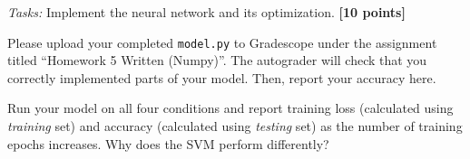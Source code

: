 \begin{tcolorbox}[colback=orange!5!white,colframe=orange!75!black]
\emph{Tasks:} Implement the neural network and its optimization. \textbf{[10 points]}

\vspace{1em}
Please upload your completed \texttt{model.py} to Gradescope under the assignment titled ``Homework 5 Written (Numpy)''. The autograder will check that you correctly implemented parts of your model. Then, report your accuracy here.
\end{tcolorbox}

\begin{tcolorbox}[colback=orange!5!white,colframe=orange!75!black]
Run your model on all four conditions and report training loss (calculated using \emph{training} set) and accuracy (calculated using \emph{testing} set) as the number of training epochs increases. Why does the SVM perform differently?
\end{tcolorbox}
